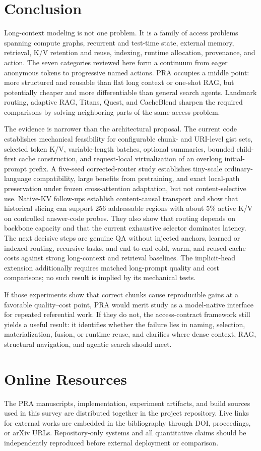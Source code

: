 \documentclass[10pt,a4paper]{article}
\begin{document}
\section{Conclusion}
Long-context modeling is not one problem. It is a family of access problems spanning compute graphs, recurrent and test-time state, external memory, retrieval, K/V retention and reuse, indexing, runtime allocation, provenance, and action. The seven categories reviewed here form a continuum from eager anonymous tokens to progressive named actions. PRA occupies a middle point: more structured and reusable than flat long context or one-shot RAG, but potentially cheaper and more differentiable than general search agents. Landmark routing, adaptive RAG, Titans, Quest, and CacheBlend sharpen the required comparisons by solving neighboring parts of the same access problem.

The evidence is narrower than the architectural proposal.  The current code establishes
mechanical feasibility for configurable chunk- and URI-level gist sets, selected token
K/V, variable-length batches, optional summaries, bounded child-first cache construction,
and request-local virtualization of an overlong initial-prompt prefix.
A five-seed corrected-router study establishes tiny-scale ordinary-language compatibility,
large benefits from pretraining, and exact local-path preservation under frozen
cross-attention adaptation, but not content-selective use. Native-KV follow-ups establish
content-causal transport and show that historical slicing can support 256 addressable
regions with about 5\% active K/V on controlled answer-code probes. They also show that
routing depends on backbone capacity and that the current exhaustive selector dominates
latency. The next decisive steps are genuine QA without injected anchors, learned or
indexed routing, recursive tasks, and end-to-end cold, warm, and reused-cache costs against
strong long-context and retrieval baselines. The implicit-head extension additionally
requires matched long-prompt quality and cost comparisons; no such result is implied by
its mechanical tests.

If those experiments show that correct chunks cause reproducible gains at a favorable
quality--cost point, PRA would merit study as a model-native interface for repeated
referential work.  If they do not, the access-contract framework still yields a useful
result: it identifies whether the failure lies in naming, selection, materialization,
fusion, or runtime reuse, and clarifies where dense context, RAG, structural navigation,
and agentic search should meet.

\fi
\section*{Online Resources}
The PRA manuscripts, implementation, experiment artifacts, and build sources used in this
survey are distributed together in the project repository. Live links for external works are
embedded in the bibliography through DOI, proceedings, or arXiv URLs. Repository-only systems
and all quantitative claims should be independently reproduced before external deployment or
comparison.



\end{document}
